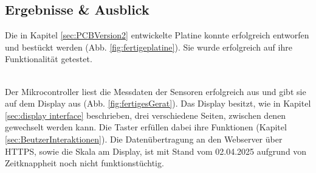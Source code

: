 \begin{inhalt}
\renewcommand*\chapterpagestyle{scrheadings}
\chapter{Ergebnisse \& Ausblick}

Die in Kapitel \ref{sec:PCBVersion2} entwickelte Platine konnte erfolgreich entworfen und bestückt werden (Abb. \ref{fig:fertigeplatine}). Sie wurde erfolgreich auf ihre Funktionalität getestet.

\bigskip \\

Der Mikrocontroller liest die Messdaten der Sensoren erfolgreich aus und gibt sie auf dem Display aus (Abb. \ref{fig:fertigesGerat}). Das Display besitzt, wie in Kapitel \ref{sec:display interface} beschrieben, drei verschiedene Seiten, zwischen denen gewechselt werden kann. Die Taster erfüllen dabei ihre Funktionen (Kapitel \ref{sec:BeutzerInteraktionen}). Die Datenübertragung an den Webserver über HTTPS, sowie die Skala am Display, ist mit Stand vom 02.04.2025 aufgrund von Zeitknappheit noch nicht funktionstüchtig.



\end{inhalt}

